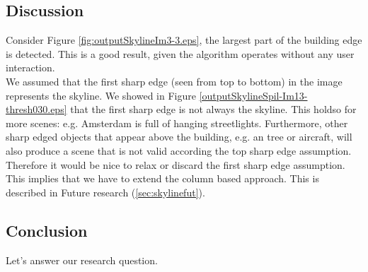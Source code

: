 \newpage
{}


\clearpage

\subsection{Discussion}  %
Consider Figure \ref{fig:outputSkylineIm3-3.eps}, the largest part of the
building edge is detected. This is a good result, given the algorithm
operates without any user interaction.\\

We assumed that the first sharp edge (seen from top to bottom) in the image 
represents the skyline. We showed in Figure \ref{outputSkylineSpil-Im13-thresh030.eps}
that the first sharp edge is not always the skyline.
This holdso for more scenes: e.g. Amsterdam is full of
hanging streetlights.  Furthermore, other sharp edged objects that appear above
the building, e.g. an tree or aircraft, will also produce a scene that is not valid according the top sharp
edge assumption.  Therefore it would be nice to relax or discard the first sharp edge assumption.
This implies that we have to extend the column based approach. This is described in Future research
(\ref{sec:skylinefut}).

\subsection{Conclusion}
Let's answer our research question.
